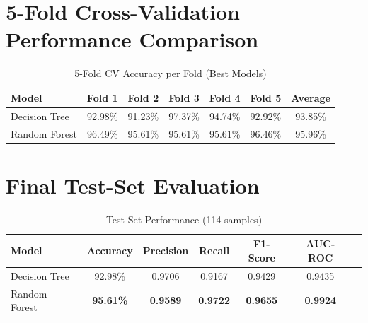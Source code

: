 \documentclass[11pt]{article}
\begin{document}
\section*{5-Fold Cross-Validation Performance Comparison}

\begin{table}[H]
\centering
\caption{5-Fold CV Accuracy per Fold (Best Models)}
\begin{tabular}{lcccccc}
\toprule
Model & Fold 1 & Fold 2 & Fold 3 & Fold 4 & Fold 5 & Average \\
\midrule
Decision Tree & 92.98\% & 91.23\% & 97.37\% & 94.74\% & 92.92\% & 93.85\% \\
Random Forest & 96.49\% & 95.61\% & 95.61\% & 95.61\% & 96.46\% & 95.96\% \\
\bottomrule
\end{tabular}
\end{table}

\section*{Final Test-Set Evaluation}

\begin{table}[H]
\centering
\caption{Test-Set Performance (114 samples)}
\begin{tabular}{lcccccc}
\toprule
\textbf{Model} & \textbf{Accuracy} & \textbf{Precision} & \textbf{Recall} & \textbf{F1-Score} & \textbf{AUC-ROC} \\
\midrule
Decision Tree  & 92.98\% & 0.9706 & 0.9167 & 0.9429 & 0.9435 \\
Random Forest  & \textbf{95.61\%} & \textbf{0.9589} & \textbf{0.9722} & \textbf{0.9655} & \textbf{0.9924} \\
\bottomrule
\end{tabular}
\end{table}
\end{document}
